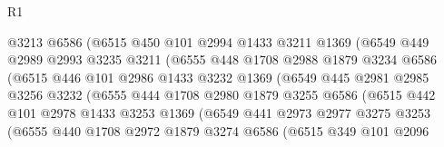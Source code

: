 \begin{lexlean}{R1}
\begin{coremodule}
                        @3213
                        @6586
                        (@6515
                          @450
                          @101
                          @2994
                          @1433
                          @3211
                          @1369
                          (@6549
                            @449
                            @2989
                            @2993
                            @3235
                            @3211
                            (@6555
                              @448
                              @1708
                              @2988
                              @1879
                              @3234
                              @6586
                              (@6515
                                @446
                                @101
                                @2986
                                @1433
                                @3232
                                @1369
                                (@6549
                                  @445
                                  @2981
                                  @2985
                                  @3256
                                  @3232
                                  (@6555
                                    @444
                                    @1708
                                    @2980
                                    @1879
                                    @3255
                                    @6586
                                    (@6515
                                      @442
                                      @101
                                      @2978
                                      @1433
                                      @3253
                                      @1369
                                      (@6549
                                        @441
                                        @2973
                                        @2977
                                        @3275
                                        @3253
                                        (@6555
                                          @440
                                          @1708
                                          @2972
                                          @1879
                                          @3274
                                          @6586
                                          (@6515
                                            @349
                                            @101
                                            @2096

\end{coremodule}
\end{lexlean}
